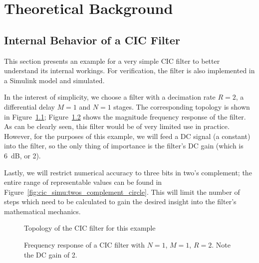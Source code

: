 \chapter{Theoretical Background} %
\label{ch:app:theoretical_background}

\section{Internal Behavior of a CIC Filter} %
\label{sec:app:cic_simu}

This  section presents  an example  for  a very  simple CIC  filter to  better
understand  its  internal  workings. For  verification,  the  filter  is  also
implemented in a Simulink model and simulated.

In the interest of simplicity, we choose  a filter with a decimation rate $R =
2$, a differential delay $M=1$ and $N=1$ stages. The corresponding topology is
shown in Figure~\ref{fig:cic_simu:topo}; Figure~\ref{fig:cic_simu:freqz} shows
the magnitude frequency  response of the filter. As can be  clearly seen, this
filter would be of very limited  use in practice. However, for the purposes of
this example, we  will feed a DC  signal (a constant) into the  filter, so the
only thing  of importance is  the filter's DC  gain (which is  \SI{6}{\dB}, or
\num{2}).

Lastly,  we  will   restrict  numerical  accuracy  to  three   bits  in  two's
complement;  the  entire  range  of  representable  values  can  be  found  in
Figure~\ref{fig:cic_simu:twos_complement_circle}. This  will limit  the number
of steps  which need  to be calculated  to gain the  desired insight  into the
filter's mathematical mechanics.

\begin{figure}
    \centering
    
    \caption[Topology of Example Filter]{Topology of the CIC filter for this example}
    \label{fig:cic_simu:topo}
\end{figure}

\begin{figure}
    \centering
    
    \caption[Frequency Respose of Example CIC Filter]{%
        Frequency response of a CIC  filter with $N=1$, $M=1$, $R=2$. Note the
        DC gain of \num{2}.%
    }
    \label{fig:cic_simu:freqz}
\end{figure}

